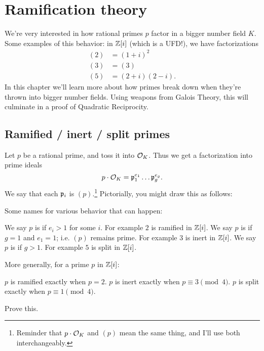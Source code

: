 \chapter{Ramification theory}
\label{ch:ramification_theory}
We're very interested in how rational primes $p$ factor in a bigger number field $K$.
Some examples of this behavior: in $\mathbb Z[i]$ (which is a UFD!), we have factorizations
\begin{align*}
	(2) &= (1+i)^2 \\
	(3) &= (3) \\
	(5) &= (2+i)(2-i).
\end{align*}
In this chapter we'll learn more about how primes break down when they're thrown into bigger number fields.
Using weapons from Galois Theory, this will culminate in a proof of Quadratic Reciprocity.

\section{Ramified / inert / split primes}

Let $p$ be a rational prime, and toss it into $\mathcal O_K$.
Thus we get a factorization into prime ideals
\[ p \cdot \mathcal O_K = \mathfrak p_1^{e_1} \dots \mathfrak p_g^{e_g}. \]
We say that each $\mathfrak p_i$ is  $(p)$.\footnote{%
	Reminder that $p \cdot \mathcal O_K$ and $(p)$ mean the same thing, and I'll use both interchangeably.}
Pictorially, you might draw this as follows:
\begin{center}
\end{center}
Some names for various behavior that can happen:
\begin{itemize}
	\ii We say $p$ is  if $e_i > 1$ for some $i$.
	For example $2$ is ramified in $\mathbb Z[i]$.
	\ii We say $p$ is  if $g=1$ and $e_1=1$; i.e. $(p)$ remains prime.
	For example $3$ is inert in $\mathbb Z[i]$.
	\ii We say $p$ is  if $g > 1$.
	For example $5$ is split in $\mathbb Z[i]$.
\end{itemize}
\begin{ques}
	More generally, for a prime $p$ in $\mathbb Z[i]$:
	\begin{itemize}
		\ii $p$ is ramified exactly when $p = 2$.
		\ii $p$ is inert exactly when $p \equiv 3 \pmod 4$.
		\ii $p$ is split exactly when $p \equiv 1 \pmod 4$.
	\end{itemize}
	Prove this.
\end{ques}

